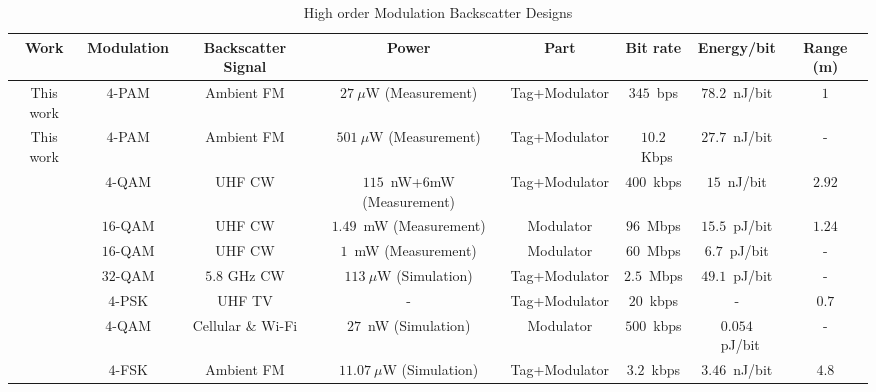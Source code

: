 \documentclass[journal]{IEEEtran}
\begin{document}
	
\begin{table}[t]	
\renewcommand{\arraystretch}{1}
\centering
\caption{High order Modulation Backscatter Designs}
\scalebox{1}
{
\begin{tabular}{c||c||c||c||c||c||c||c}
\hline
\hline
Work & Modulation & Backscatter Signal &  Power & Part & Bit rate & Energy/bit & Range (m)\\
\hline
This work & $4$-PAM & Ambient FM&$27~\mu$W (Measurement) & Tag+Modulator & $345$~bps & $78.2$~nJ/bit & $1$ \\
\hline
This work & $4$-PAM&  Ambient FM &$501~\mu$W (Measurement)& Tag+Modulator & $10.2$~Kbps& $27.7$~nJ/bit &- \\
\hline
\cite{thomas2012quadrature}&$4$-QAM &  UHF CW& $115$~nW+$6$mW (Measurement) & Tag+Modulator &$400$~kbps& $15$~nJ/bit & $2.92$\\
\hline
\cite{thomas201296}&$16$-QAM&  UHF CW& $1.49$~mW (Measurement) & Modulator &$96$~Mbps& $15.5$~pJ/bit & $1.24$\\
\hline
\cite{correia2017quadrature} &$16$-QAM&  UHF CW &$1$~mW (Measurement) & Modulator &$60$~Mbps &$6.7$~pJ/bit &- \\
\hline
\cite{shirane201513}&$32$-QAM& $5.8$ GHz CW & $113~\mu$W (Simulation) & Tag+Modulator & $2.5$~Mbps& $49.1$~pJ/bit &-\\
\hline
 \cite{qian2018iot}&$4$-PSK&  UHF TV & - & Tag+Modulator & $20$~kbps& -& $0.7$\\
\hline
\cite{correia2018dual}&$4$-QAM& Cellular \& Wi-Fi & $27$~nW (Simulation) & Modulator & $500$~kbps& $0.054$~pJ/bit &- \\
\hline
\cite{wang2017fm}&$4$-FSK&  Ambient FM& $11.07~\mu$W (Simulation) & Tag+Modulator & $3.2$~kbps& $3.46$~nJ/bit& $4.8$\\



\hline
\hline
\end{tabular}
}
\label{tab:comparison}
\end{table}

%
%
\end{document}
